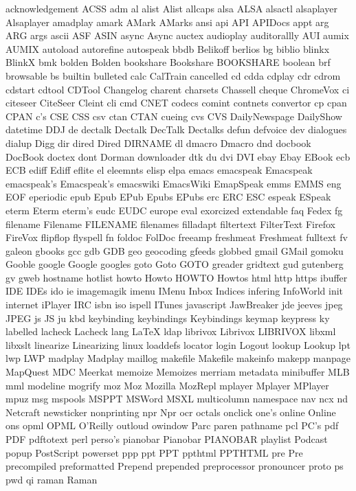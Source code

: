 acknowledgement
ACSS
adm
al
alist
Alist
allcaps
alsa
ALSA
alsactl
alsaplayer
Alsaplayer
amadplay
amark
AMark
AMarks
ansi
api
API
APIDocs
appt
arg
ARG
args
ascii
ASF
ASIN
async
Async
auctex
audioplay
auditorallly
AUI
aumix
AUMIX
autoload
autorefine
autospeak
bbdb
Belikoff
berlios
bg
biblio
blinkx
BlinkX
bmk
bolden
Bolden
bookshare
Bookshare
BOOKSHARE
boolean
brf
browsable
bs
builtin
bulleted
calc
CalTrain
cancelled
cd
cdda
cdplay
cdr
cdrom
cdstart
cdtool
CDTool
Changelog
charent
charsets
Chassell
cheque
ChromeVox
ci
citeseer
CiteSeer
Cleint
cli
cmd
CNET
codecs
comint
contnets
convertor
cp
cpan
CPAN
c's
CSE
CSS
csv
ctan
CTAN
cueing
cvs
CVS
DailyNewspage
DailyShow
datetime
DDJ
de
dectalk
Dectalk
DecTalk
Dectalks
defun
defvoice
dev
dialogues
dialup
Digg
dir
dired
Dired
DIRNAME
dl
dmacro
Dmacro
dnd
docbook
DocBook
doctex
dont
Dorman
downloader
dtk
du
dvi
DVI
ebay
Ebay
EBook
ecb
ECB
ediff
Ediff
eflite
el
eleemnts
elisp
elpa
emacs
emacspeak
Emacspeak
emacspeak's
Emacspeak's
emacswiki
EmacsWiki
EmapSpeak
emms
EMMS
eng
EOF
eperiodic
epub
Epub
EPub
Epubs
EPubs
erc
ERC
ESC
espeak
ESpeak
eterm
Eterm
eterm's
eudc
EUDC
europe
eval
exorcized
extendable
faq
Fedex
fg
filename
Filename
FILENAME
filenames
filladapt
filtertext
FilterText
Firefox
FireVox
flipflop
flyspell
fn
foldoc
FolDoc
freeamp
freshmeat
Freshmeat
fulltext
fv
galeon
gbooks
gcc
gdb
GDB
geo
geocoding
gfeeds
globbed
gmail
GMail
gomoku
Gooble
google
Google
googles
goto
Goto
GOTO
greader
gridtext
gud
gutenberg
gv
gweb
hostname
hotlist
howto
Howto
HOWTO
Howtos
html
http
https
ibuffer
IDE
IDEs
ido
ie
imagemagik
imenu
IMenu
Inbox
Indices
infering
InfoWorld
init
internet
iPlayer
IRC
isbn
iso
ispell
ITunes
javascript
JawBreaker
jde
jeeves
jpeg
JPEG
js
JS
ju
kbd
keybinding
keybindings
Keybindings
keymap
keypress
ky
labelled
lacheck
Lacheck
lang
LaTeX
ldap
librivox
Librivox
LIBRIVOX
libxml
libxslt
linearize
Linearizing
linux
loaddefs
locator
login
Logout
lookup
Lookup
lpt
lwp
LWP
madplay
Madplay
maillog
makefile
Makefile
makeinfo
makepp
manpage
MapQuest
MDC
Meerkat
memoize
Memoizes
merriam
metadata
minibuffer
MLB
mml
modeline
mogrify
moz
Moz
Mozilla
MozRepl
mplayer
Mplayer
MPlayer
mpuz
msg
mspools
MSPPT
MSWord
MSXL
multicolumn
namespace
nav
ncx
nd
Netcraft
newsticker
nonprinting
npr
Npr
ocr
octals
onclick
one's
online
Online
ons
opml
OPML
O'Reilly
outloud
owindow
Parc
paren
pathname
pcl
PC's
pdf
PDF
pdftotext
perl
perso's
pianobar
Pianobar
PIANOBAR
playlist
Podcast
popup
PostScript
powerset
ppp
ppt
PPT
ppthtml
PPTHTML
pre
Pre
precompiled
preformatted
Prepend
prepended
preprocessor
pronouncer
proto
ps
pwd
qi
raman
Raman
